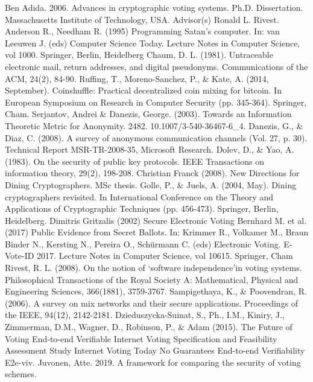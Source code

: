 \begin{thebibliography}{9}
  
 Ben Adida. 2006. Advances in cryptographic voting systems. Ph.D. Dissertation. Massachusetts Institute of Technology, USA. Advisor(s) Ronald L. Rivest.
 Anderson R., Needham R. (1995) Programming Satan's computer. In: van Leeuwen J. (eds) Computer Science Today. Lecture Notes in Computer Science, vol 1000. Springer, Berlin, Heidelberg
 Chaum, D. L. (1981). Untraceable electronic mail, return addresses, and digital pseudonyms. Communications of the ACM, 24(2), 84-90.
 Ruffing, T., Moreno-Sanchez, P., \& Kate, A. (2014, September). Coinshuffle: Practical decentralized coin mixing for bitcoin. In European Symposium on Research in Computer Security (pp. 345-364). Springer, Cham.
 Serjantov, Andrei \& Danezis, George. (2003). Towards an Information Theoretic Metric for Anonymity. 2482. 10.1007/3-540-36467-6\_4.
 Danezis, G., \& Diaz, C. (2008). A survey of anonymous communication channels (Vol. 27, p. 30). Technical Report MSR-TR-2008-35, Microsoft Research.
 Dolev, D., \& Yao, A. (1983). On the security of public key protocols. IEEE Transactions on information theory, 29(2), 198-208.
 Christian Franck (2008). New Directions for Dining Cryptographers. MSc thesis.
 Golle, P., \& Juels, A. (2004, May). Dining cryptographers revisited. In International Conference on the Theory and Applications of Cryptographic Techniques (pp. 456-473). Springer, Berlin, Heidelberg.
 Dimitris Gritzalis (2002) Secure Electronic Voting
 Bernhard M. et al. (2017) Public Evidence from Secret Ballots. In: Krimmer R., Volkamer M., Braun Binder N., Kersting N., Pereira O., Schürmann C. (eds) Electronic Voting. E-Vote-ID 2017. Lecture Notes in Computer Science, vol 10615. Springer, Cham 
 Rivest, R. L. (2008). On the notion of ‘software independence’in voting systems. Philosophical Transactions of the Royal Society A: Mathematical, Physical and Engineering Sciences, 366(1881), 3759-3767.
 Sampigethaya, K., \& Poovendran, R. (2006). A survey on mix networks and their secure applications. Proceedings of the IEEE, 94(12), 2142-2181.
 Dzieduszycka-Suinat, S., Ph., I.M., Kiniry, J., Zimmerman, D.M., Wagner, D., Robinson, P., \& Adam (2015). The Future of Voting End-to-end Verifiable Internet Voting Specification and Feasibility Assessment Study Internet Voting Today No Guarantees End-to-end Verifiability E2e-viv.
 Juvonen, Atte. 2019. A framework for comparing the security of voting schemes.
  
\end{thebibliography}